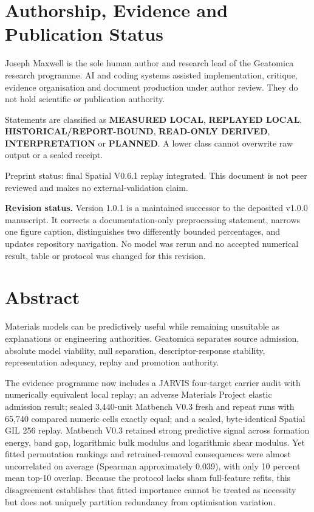 \documentclass[11pt,a4paper,oneside]{report}
\begin{document}






\clearpage
\chapter*{Authorship, Evidence and Publication Status}

Joseph Maxwell is the sole human author and research lead of the Geatomica research
programme. AI and coding systems assisted implementation, critique, evidence organisation and document production under author review. They do not hold scientific or publication authority.

Statements are classified as \textbf{MEASURED LOCAL}, \textbf{REPLAYED LOCAL},
\textbf{HISTORICAL/\allowbreak REPORT-BOUND}, \textbf{READ-ONLY DERIVED},
\textbf{INTERPRETATION} or \textbf{PLANNED}. A lower class cannot overwrite raw
output or a sealed receipt.

Preprint status: final Spatial V0.6.1 replay integrated. This document is not peer reviewed and makes no external-validation claim.

\textbf{Revision status.} Version 1.0.1 is a maintained successor to the deposited v1.0.0 manuscript. It corrects a documentation-only preprocessing statement, narrows one figure caption, distinguishes two differently bounded percentages, and updates repository navigation. No model was rerun and no accepted numerical result, table or protocol was changed for this revision.

\clearpage
\chapter*{Abstract}

Materials models can be predictively useful while remaining unsuitable as
explanations or engineering authorities. Geatomica separates source admission,
absolute model viability, null separation, descriptor-response stability,
representation adequacy, replay and promotion authority.

The evidence programme now includes a JARVIS four-target carrier audit with
numerically equivalent local replay; an adverse Materials Project elastic
admission result; sealed 3,440-unit Matbench V0.3 fresh and repeat runs with
65,740 compared numeric cells exactly equal;
and a sealed, byte-identical Spatial GIL 256 replay. Matbench V0.3 retained strong
predictive signal across formation energy, band gap, logarithmic bulk modulus and
logarithmic shear modulus. Yet fitted permutation rankings and retrained-removal
consequences were almost uncorrelated on average (Spearman approximately 0.039),
with only 10 percent mean top-10 overlap. Because the protocol lacks sham
full-feature refits, this disagreement establishes that fitted importance cannot
be treated as necessity but does not uniquely partition redundancy from
optimisation variation.
\end{document}
